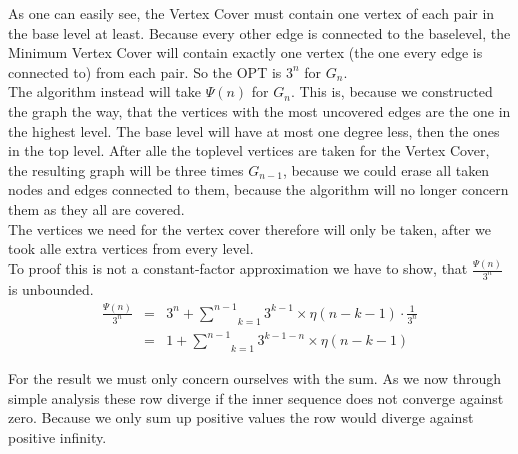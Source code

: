 \documentclass[11pt,a4paper,ngerman]{article}
\begin{document}
\begin{description}
As one can easily see, the Vertex Cover must contain one vertex of each pair in the base level at least. Because every other edge is connected to the baselevel, the Minimum Vertex Cover will contain exactly one vertex (the one every edge is connected to) from each pair. So the OPT is $3^n$ for $G_n$.\\

The algorithm instead will take $\Psi (n)$ for $G_n$. This is, because we constructed the graph the way, that the vertices with the most uncovered edges are the one in the highest level. The base level will have at most one degree less, then the ones in the top level. After alle the toplevel vertices are taken for the Vertex Cover, the resulting graph will be three times $G_{n-1}$, because we could erase all taken nodes and edges connected to them, because the algorithm will no longer concern them as they all are covered.\\
The vertices we need for the vertex cover therefore will only be taken, after we took alle extra vertices from every level.\\

To proof this is not a constant-factor approximation we have to show, that $\frac{\Psi (n)}{ 3^n }$ is unbounded.
$$
\begin{array}{rcl}
\frac{\Psi(n)}{3^n} &=& 3^n + \underset{k=1}{\overset{n-1}{\sum}} 3^{k-1} \times \eta (n - k - 1) \cdot \frac{1}{3^n}\\
&=& 1 + \underset{k=1}{\overset{n-1}{\sum}} 3^{k - 1 - n} \times \eta (n - k - 1)
\end{array}
$$

For the result we must only concern ourselves with the sum. As we now through simple analysis these row diverge if the inner sequence does not converge against zero. Because we only sum up positive values the row would diverge against positive infinity.\\


\end{description}
\end{document}
